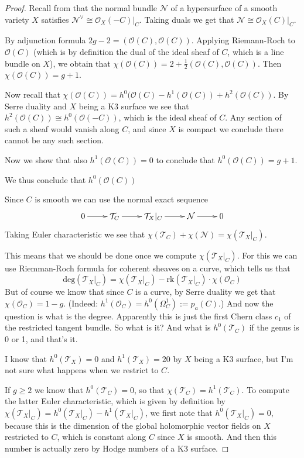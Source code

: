 \begin{proof}
Recall from \cite[p. 146]{gri} that the
normal bundle
$\mathcal{N}$ of a hypersurface of a smooth
variety $X$ satisfies
$\mathcal{N}^\vee\cong\mathcal{O}_X(-C)|_{C}
$.
Taking duals we get that
$\mathcal{N}\cong\mathcal{O}_X(C)|_{C}$.

By adjunction formula
$2g-2=(\mathcal{O}(C),\mathcal{O}(C))$.
Applying Riemann-Roch
to $\mathcal{O}(C)$ (which is by definition
the dual of the ideal sheaf of $C$,
which is a line bundle on $X$), we obtain
that
$\chi(\mathcal{O}(C))=2+\frac{1}{2}
(\mathcal{O}(C),\mathcal{O}(C))$.
Then
$\chi(\mathcal{O}(C))=g+1$.

Now recall that
$\chi(\mathcal{O}(C))=h^0(\mathcal{O}(C)
-h^1(\mathcal{O}(C))+h^2(\mathcal{O}(C))$. By
Serre duality and $X$ being a K3
surface we see that $h^2(\mathcal{O}(C))\cong
h^{0}(\mathcal{O}(-C))$, which is
the ideal sheaf of $C$. Any section of such a
sheaf would vanish along $C$, and
since $X$ is compact we conclude there cannot
be any such section.

Now we show that also $h^1(\mathcal{O}(C))=0$
to conclude that
$h^0(\mathcal{O}(C))=g+1$.

We thus conclude that $h^0(\mathcal{O}(C))$




Since $C$ is smooth we can use the normal
exact sequence
$$
\xymatrix{
0\ar[r]&\mathcal{T}_C\ar[r]&\mathcal{T}
_X|_{C}\ar[r]&\mathcal{N}\ar[r]&0
}
$$
Taking Euler characteristic we see that
$\chi(\mathcal{T}_C)+\chi(\mathcal{N})=
\chi(\mathcal{T}_X|_{C})$.


This means that we should be done once we
compute $\chi(\mathcal{T}_X|_{C})$.
For this we can use Riemman-Roch formula for
coherent sheaves on a curve, which
tells us that
$$
\text{deg}(\mathcal{T}_X|_{C})=
\chi(\mathcal{T}_X|_{C})
-\text{rk}(\mathcal{T}_X|_{C})
\cdot\chi(\mathcal{O}_C)
$$
But of course we know that since $C$ is a
curve, by Serre duality we get that
$\chi(\mathcal{O}_C)=1-g$. (Indeed:
$h^1(\mathcal{O}_C)=h^0(\Omega^1_C):=p_a(C)
$.)
And now the question is what is
the degree. Apparently this is just the first
Chern class $c_1$ of the
restricted tangent bundle. So what is it? And
what is $h^0(\mathcal{T}_C)$ if
the genus is 0 or 1, and that's it.

I
know that $h^0(\mathcal{T}_X)=0$ and
$h^1(\mathcal{T}_X)=20$ by $X$ being a K3
surface, but I'm not sure what happens when
we restrict to $C$.

If $g \geq 2$ we know that
$h^0(\mathcal{T}_C)=0$, so that
$\boxed{\chi(\mathcal{T}_C)=h^1(\mathcal{T}
_C)}$.
\bigskip
To compute the
latter Euler characteristic, which is given
by definition by
$\chi(\mathcal{T}_X|_{C})=h^0(\mathcal{T}
_X|_{C})-h^1(\mathcal{T}_X|_{C})$,
we
first note that $h^0(\mathcal{T}_X|_{C})=0$,
because this is the dimension of
the global holomorphic vector fields on $X$
restricted to $C$, which is constant along
$C$ since $X$ is
smooth. And then this number is actually zero
by Hodge numbers of a K3 surface.


\end{proof}
